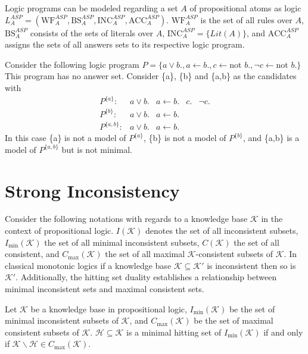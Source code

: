 Logic programs can be modeled regarding a set \(A\) of propositional atoms as logic \(L_A^{ASP} = (\text{WF}_A^{ASP}, \text{BS}_A^{ASP}, \text{INC}_A^{ASP}, \text{ACC}_A^{ASP})\). \(\text{WF}_A^{ASP}\) is the set of all rules over \(A\), \(\text{BS}_A^{ASP}\) consists of the sets of literals over \(A\), \(\text{INC}_A^{ASP} = \{Lit(A)\}\), and \(\text{ACC}_A^{ASP}\) assigns the sets of all answers sets to its respective logic program.

\begin{example}
    Consider the following logic program \(P = \{a \lor b., a \leftarrow b., c \leftarrow \text{not }b., \neg c \leftarrow \text{not }b.\}\) This program has no answer set. Consider \{a\}, \{b\} and \{a,b\} as the candidates with
    \[\begin{array}{rrrrr}
            P^{\{a\}}:   & a \lor b. & a \leftarrow b. & c. & \neg c. \\
            P^{\{b\}}:   & a \lor b. & a \leftarrow b.                \\
            P^{\{a,b\}}: & a \lor b. & a \leftarrow b.
        \end{array}\]
    In this case \{a\} is not a model of \(P^{\{a\}}\), \{b\} is not a model of \(P^{\{b\}}\), and \{a,b\} is a model of \(P^{\{a,b\}}\) but is not minimal.
    \label{ex:program}
\end{example}

\section{Strong Inconsistency}
Consider the following notations with regards to a knowledge base \(\mathcal{K}\) in the context of propositional logic. \(I(\mathcal{K})\) denotes the set of all inconsistent subsets, \(I_{\min}(\mathcal{K})\) the set of all minimal inconsistent subsets, \(C(\mathcal{K})\) the set of all consistent, and \(C_{\max}(\mathcal{K})\) the set of all maximal \(\mathcal{K}\)-consistent subsets of \(\mathcal{K}\). In classical monotonic logics if a knowledge base \(\mathcal{K} \subseteq \mathcal{K}'\) is inconsistent then so is \(\mathcal{K}'\). Additionally, the hitting set duality \cite{reiter_theory_1987} establishes a relationship between minimal inconsistent sets and maximal consistent sets.

\begin{theorem}
    Let \(\mathcal{K}\) be a knowledge base in propositional logic, \(I_{\min}(\mathcal{K})\) be the set of minimal inconsistent subsets of \(\mathcal{K}\), and \(C_{\max}(\mathcal{K})\) be the set of maximal consistent subsets of \(\mathcal{K}\). \(\mathcal{H} \subseteq \mathcal{K}\) is a minimal hitting set of \(I_{\min}(\mathcal{K})\) if and only if \(\mathcal{K} \backslash \mathcal{H} \in C_{\max}(\mathcal{K})\).
\end{theorem}

